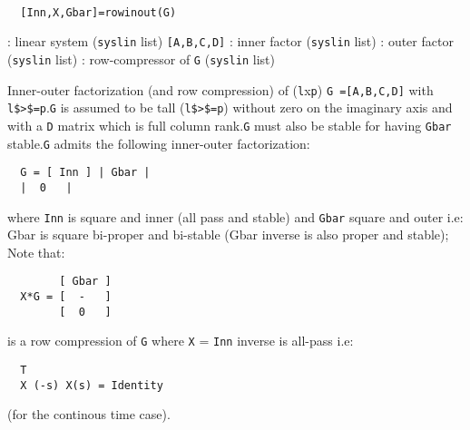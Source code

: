 \begin{mandesc}
   \\ %
\end{mandesc}
\begin{calling_sequence}
\begin{verbatim}
  [Inn,X,Gbar]=rowinout(G)  
\end{verbatim}
\end{calling_sequence}
\begin{parameters}
  \begin{varlist}
    : linear system (\verb!syslin! list) \verb![A,B,C,D]!
    :  inner factor (\verb!syslin! list)
    :  outer factor (\verb!syslin! list)
    :  row-compressor of \verb!G! (\verb!syslin! list)
  \end{varlist}
\end{parameters}
\begin{mandescription}
  Inner-outer factorization (and row compression) of (\verb!l!x\verb!p!) \verb!G =[A,B,C,D]! with \verb!l$>$=p!.\verb!G! is assumed to be tall (\verb!l$>$=p!) without zero on the imaginary axis
  and with a \verb!D! matrix which is full column rank.\verb!G! must also be stable for having \verb!Gbar! stable.\verb!G! admits the following inner-outer factorization:
\begin{verbatim}
  G = [ Inn ] | Gbar |
  |  0   |
\end{verbatim}
where \verb!Inn! is square and inner (all pass and stable) and \verb!Gbar! 
square and outer i.e:
Gbar is square bi-proper and bi-stable (Gbar inverse is also proper 
and stable);
Note that:
\begin{verbatim}
        [ Gbar ]
  X*G = [  -   ]
        [  0   ]
\end{verbatim}
is a row compression of \verb!G! where \verb!X! = \verb!Inn! inverse is all-pass i.e:
\begin{verbatim}
  T
  X (-s) X(s) = Identity
\end{verbatim}
(for the continous time case).
\end{mandescription}
\begin{manseealso}
     
\end{manseealso}
